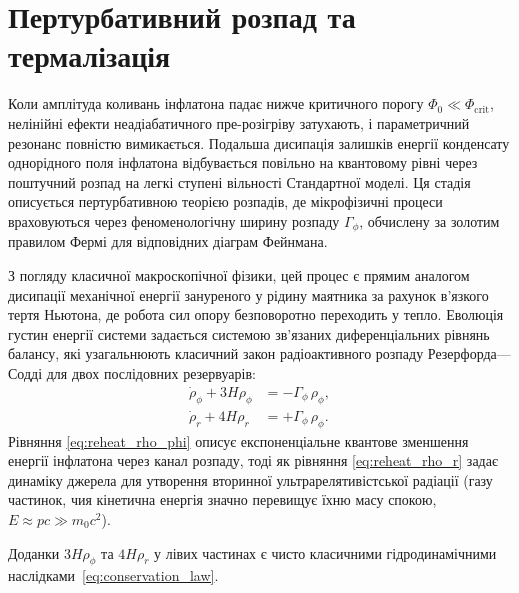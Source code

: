 \section{Пертурбативний розпад та термалізація}

Коли амплітуда коливань інфлатона падає нижче критичного порогу $\Phi_0 \ll \Phi_{\mathrm{crit}}$, нелінійні ефекти неадіабатичного пре-розігріву затухають, і параметричний резонанс повністю вимикається. Подальша дисипація залишків енергії конденсату однорідного поля інфлатона відбувається повільно на квантовому рівні через поштучний розпад на легкі ступені вільності Стандартної моделі. Ця стадія описується пертурбативною теорією розпадів, де мікрофізичні процеси враховуються через феноменологічну ширину розпаду $\Gamma_\phi$, обчислену за золотим правилом Фермі для відповідних діаграм Фейнмана.

З погляду класичної макроскопічної фізики, цей процес є прямим аналогом дисипації механічної енергії зануреного у рідину маятника за рахунок в'язкого тертя Ньютона, де робота сил опору безповоротно переходить у тепло. Еволюція густин енергії системи задається системою зв'язаних диференціальних рівнянь балансу, які узагальнюють класичний закон радіоактивного розпаду Резерфорда---Содді для двох послідовних резервуарів:
\begin{align}
  \dot{\rho}_\phi + 3H\rho_\phi
    &= -\Gamma_\phi\,\rho_\phi,
    \label{eq:reheat_rho_phi} \\
  \dot{\rho}_r + 4H\rho_r
    &= +\Gamma_\phi\,\rho_\phi.
    \label{eq:reheat_rho_r}
\end{align}
Рівняння \eqref{eq:reheat_rho_phi} описує експоненціальне квантове зменшення енергії інфлатона через канал розпаду, тоді як рівняння \eqref{eq:reheat_rho_r} задає динаміку джерела для утворення вторинної ультрарелятивістської радіації (газу частинок, чия кінетична енергія значно перевищує їхню масу спокою, $E \approx pc \gg m_0 c^2$).

Доданки $3H\rho_\phi$ та $4H\rho_r$ у лівих частинах є чисто класичними гідродинамічними наслідками~\eqref{eq:conservation_law}.

